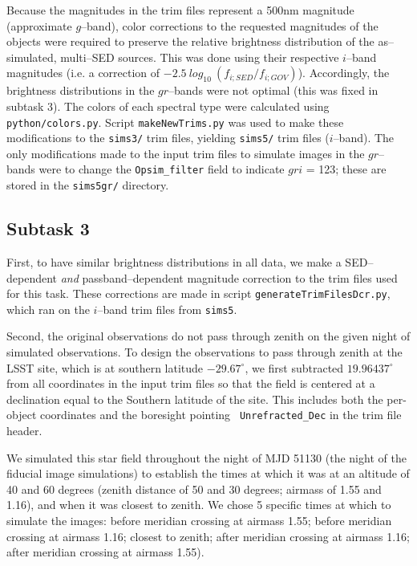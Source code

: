 \documentclass[prd, nofootinbib, floatfix, 11pt, tightenlines, times]{article}
\begin{document}
\begin{appendices}
Because the magnitudes in the trim files represent a 500nm magnitude
(approximate $g$--band), color corrections to the requested magnitudes
of the objects were required to preserve the relative brightness
distribution of the as--simulated, multi--SED sources.  This was done
using their respective $i$--band magnitudes (i.e. a correction of
$-2.5~log_{10}~( f_{i;SED} / f_{i;GOV} )$).  Accordingly, the
brightness distributions in the $gr$--bands were not optimal (this was
fixed in subtask 3).  The colors of each spectral type were calculated
using {\tt python/colors.py}.  Script {\tt makeNewTrims.py} was used
to make these modifications to the {\tt sims3/} trim files, yielding
{\tt sims5/} trim files ($i$--band).  The only modifications made to
the input trim files to simulate images in the $gr$--bands were to
change the {\tt Opsim\_filter} field to indicate $gri$ = 123; these
are stored in the {\tt sims5gr/} directory.

\subsection{Subtask 3}

First, to have similar brightness distributions in all data, we make a
SED--dependent {\it and} passband--dependent magnitude correction to
the trim files used for this task.  These corrections are made in
script {\tt generateTrimFilesDcr.py}, which ran on the $i$--band trim
files from {\tt sims5}.

Second, the original observations do not pass through zenith on the
given night of simulated observations.  To design the observations to
pass through zenith at the LSST site, which is at southern latitude
$-29.67^{\circ}$, we first subtracted $19.96437^{\circ}$ from all
coordinates in the input trim files so that the field is centered at a
declination equal to the Southern latitude of the site.  This includes
both the per-object coordinates and the boresight pointing {\tt
  Unrefracted\_Dec} in the trim file header.

We simulated this star field throughout the night of MJD 51130 (the
night of the fiducial image simulations) to establish the times at
which it was at an altitude of 40 and 60 degrees (zenith distance of
50 and 30 degrees; airmass of 1.55 and 1.16), and when it was closest
to zenith.  We chose 5 specific times at which to simulate the images:
before meridian crossing at airmass 1.55; before meridian crossing at
airmass 1.16; closest to zenith; after meridian crossing at airmass
1.16; after meridian crossing at airmass 1.55).


\end{appendices}
\end{document}
